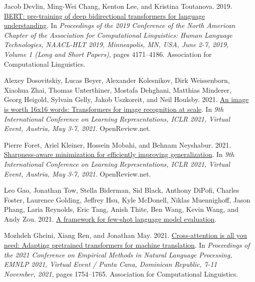 \documentclass[11pt,dvipsnames]{article}
\begin{document}
{\begin{thebibliography}{73}
Jacob Devlin, Ming{-}Wei Chang, Kenton Lee, and Kristina Toutanova. 2019.
\newblock \href {https://doi.org/10.18653/v1/n19-1423} {{BERT:} pre-training of
  deep bidirectional transformers for language understanding}.
\newblock In \emph{Proceedings of the 2019 Conference of the North American
  Chapter of the Association for Computational Linguistics: Human Language
  Technologies, {NAACL-HLT} 2019, Minneapolis, MN, USA, June 2-7, 2019, Volume
  1 (Long and Short Papers)}, pages 4171--4186. Association for Computational
  Linguistics.

Alexey Dosovitskiy, Lucas Beyer, Alexander Kolesnikov, Dirk Weissenborn,
  Xiaohua Zhai, Thomas Unterthiner, Mostafa Dehghani, Matthias Minderer, Georg
  Heigold, Sylvain Gelly, Jakob Uszkoreit, and Neil Houlsby. 2021.
\newblock \href {https://openreview.net/forum?id=YicbFdNTTy} {An image is worth
  16x16 words: Transformers for image recognition at scale}.
\newblock In \emph{9th International Conference on Learning Representations,
  {ICLR} 2021, Virtual Event, Austria, May 3-7, 2021}. OpenReview.net.

Pierre Foret, Ariel Kleiner, Hossein Mobahi, and Behnam Neyshabur. 2021.
\newblock \href {https://openreview.net/forum?id=6Tm1mposlrM} {Sharpness-aware
  minimization for efficiently improving generalization}.
\newblock In \emph{9th International Conference on Learning Representations,
  {ICLR} 2021, Virtual Event, Austria, May 3-7, 2021}. OpenReview.net.

Leo Gao, Jonathan Tow, Stella Biderman, Sid Black, Anthony DiPofi, Charles
  Foster, Laurence Golding, Jeffrey Hsu, Kyle McDonell, Niklas Muennighoff,
  Jason Phang, Laria Reynolds, Eric Tang, Anish Thite, Ben Wang, Kevin Wang,
  and Andy Zou. 2021.
\newblock \href {https://doi.org/10.5281/zenodo.5371628} {A framework for
  few-shot language model evaluation}.

Mozhdeh Gheini, Xiang Ren, and Jonathan May. 2021.
\newblock \href {https://doi.org/10.18653/V1/2021.EMNLP-MAIN.132}
  {Cross-attention is all you need: Adapting pretrained transformers for
  machine translation}.
\newblock In \emph{Proceedings of the 2021 Conference on Empirical Methods in
  Natural Language Processing, {EMNLP} 2021, Virtual Event / Punta Cana,
  Dominican Republic, 7-11 November, 2021}, pages 1754--1765. Association for
  Computational Linguistics.


\end{thebibliography}}
\end{document}
